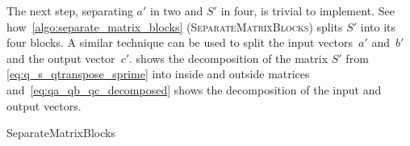 The next step, separating $a'$ in two and $S'$ in four, is trivial to implement.
See how~\cref{algo:separate_matrix_blocks} (\textsc{SeparateMatrixBlocks}) splits $S'$ into its four blocks.
A similar technique can be used to split the input vectors~$a'$ and~$b'$ and the output vector~$c'$.
 shows the decomposition of the matrix $S'$ from \cref{eq:q_s_qtranspose_sprime} into inside and outside matrices and~\cref{eq:qa_qb_qc_decomposed} shows the decomposition of the input and output vectors.

\begin{algorithm}
    \caption{SeparateMatrixBlocks}
    \label{algo:separate_matrix_blocks}
    \begin{algorithmic}
         
         
        \\ 
        \EndFunction
    \end{algorithmic}
\end{algorithm}


